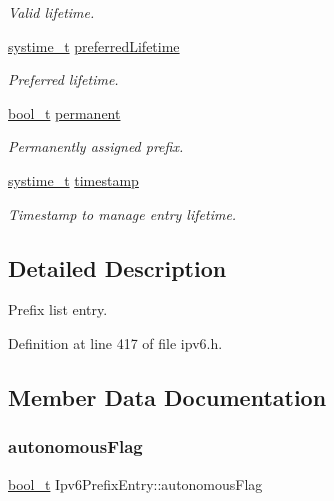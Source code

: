\begin{DoxyCompactItemize}
\begin{DoxyCompactList}\small\item\em Valid lifetime. \end{DoxyCompactList}\item 
\hyperlink{compiler__port_8h_ae3e32a98d431a02106616da3071832dd}{systime\+\_\+t} \hyperlink{structIpv6PrefixEntry_affc16d60fc2bd38a653b214a41968b0e}{preferred\+Lifetime}
\begin{DoxyCompactList}\small\item\em Preferred lifetime. \end{DoxyCompactList}\item 
\hyperlink{compiler__port_8h_a812d16e5494522586b3784e55d479912}{bool\+\_\+t} \hyperlink{structIpv6PrefixEntry_a9f6301283cb4b3a6d2e3ffeed9e68f90}{permanent}
\begin{DoxyCompactList}\small\item\em Permanently assigned prefix. \end{DoxyCompactList}\item 
\hyperlink{compiler__port_8h_ae3e32a98d431a02106616da3071832dd}{systime\+\_\+t} \hyperlink{structIpv6PrefixEntry_a3c685a8be455dd84c5b4886b082fe943}{timestamp}
\begin{DoxyCompactList}\small\item\em Timestamp to manage entry lifetime. \end{DoxyCompactList}\end{DoxyCompactItemize}


\subsection{Detailed Description}
Prefix list entry. 

Definition at line 417 of file ipv6.\+h.



\subsection{Member Data Documentation}
\mbox{\label{structIpv6PrefixEntry_a072d6a4bd262b000583605778f913595}} 
\subsubsection{\texorpdfstring{autonomous\+Flag}{autonomousFlag}}
{\footnotesize\ttfamily \hyperlink{compiler__port_8h_a812d16e5494522586b3784e55d479912}{bool\+\_\+t} Ipv6\+Prefix\+Entry\+::autonomous\+Flag}



